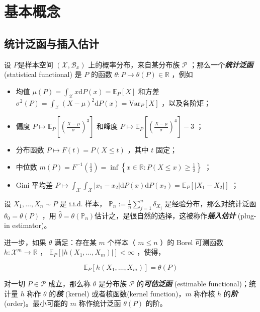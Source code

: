 \section{基本概念}

\subsection{统计泛函与插入估计}\label{sec:ch10a:plug-in}

设 $P$是样本空间 $(\mathscr X,\mathscr B_x)$ 上的概率分布，来自某分布族 $\mathscr P$ ；那么一个\textbf{\emph{统计泛函}} (statistical functional) 是 $P$ 的函数 $\theta: P\mapsto \theta(P)\in\mathbb R$ ，例如

\begin{itemize}
\tightlist
\item
  均值 $\mu(P)=\int_{\mathscr X}x\mathrm{d}P(x)=\mathbb{E}_P[X]$ 和方差 $\sigma^2(P)=\int_{\mathscr X}(X-\mu)^2\mathrm{d}P(x)=\mathrm{Var}_P[X]$ ，以及各阶矩；
\item
  偏度 $P\mapsto \mathbb{E}_P\left[\left(\tfrac{X-\mu}{\sigma}\right)^3\right]$ 和峰度 $P\mapsto\mathbb{E}_P\left[\left(\tfrac{X-\mu}{\sigma}\right)^4\right]-3$ ；
\item
  分布函数 $P\mapsto F(t)=P(X\le t)$ ，其中 $t$ 固定；
\item
  中位数 $m(P)=F^{-1}(\tfrac12)=\inf\left\{x\in\mathbb R:P(X\le x)\ge \tfrac12\right\}$ ；
\item
  Gini 平均差 $P\mapsto \int_{\mathscr X}\!\int_{\mathscr X}|x_1-x_2|\mathrm dP(x)\mathrm dP(x_2)=\mathbb E_P[|X_1-X_2|]$ ；
\end{itemize}

设 $X_1,\dots,X_n\sim P$ 是 i.i.d. 样本， $\mathbb P_n:=\frac1n\sum_{j=1}^n\delta_{X_j}$ 是经验分布，那么对统计泛函 $\theta_0=\theta(P)$ ，用 $\widehat\theta=\theta(\mathbb P_n)$估计之，是很自然的选择，这被称作\textbf{\emph{插入估计}} (plug-in estimator)。

进一步，如果 $\theta$ 满足：存在某 $m$ 个样本（ $m\le n$ ）的 Borel 可测函数 $h:\mathscr X^m\to\mathbb R$ ， $\mathbb E_P[|h(X_1,\dots,X_m)|]<\infty$ ，使得，

\begin{equation}
\label{eq:ch10a:tag-1}
\mathbb{E}_P[h(X_1,\dots,X_m)]=\theta(P)
\end{equation}

对一切 $P\in\mathscr P$ 成立，那么称 $\theta$ 是分布族 $\mathscr P$ 的\textbf{\emph{可估泛函}} (estimable functional)；统计量 $h$ 称作 $\theta$ 的\textbf{\emph{核}} (kernel) 或者核函数(kernel function)，$m$ 称作核 $h$ 的\textbf{\emph{阶}} (order)。最小可能的 $m$ 称作统计泛函 $\theta(P)$ 的阶。

